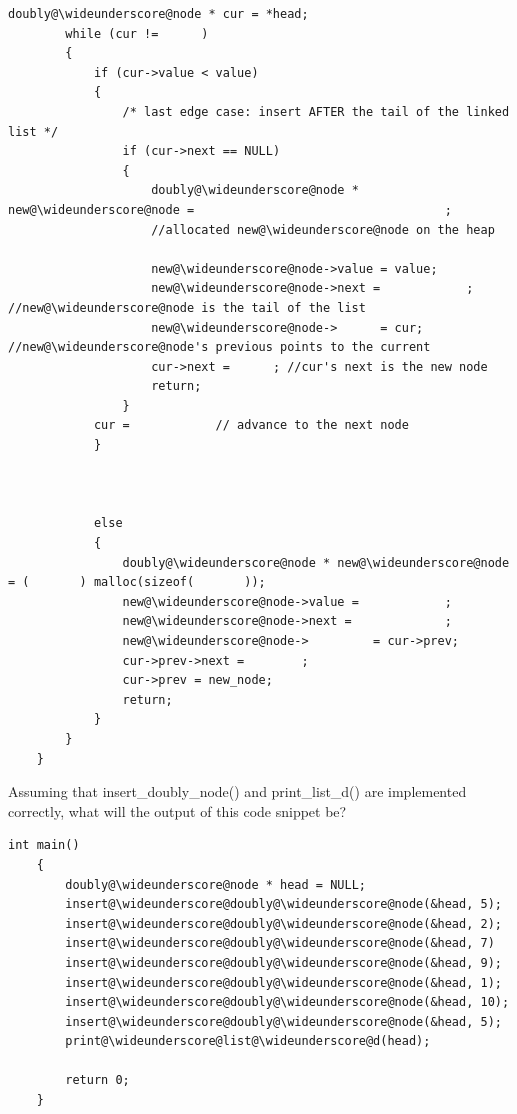 \documentclass{article}
\begin{document}
\begin{enumerate}[label=(\alph*), itemsep = 120pt]
\begin{lstlisting}[style = CStyle]
        doubly@\wideunderscore@node * cur = *head;
        while (cur !=      )
        {
            if (cur->value < value)
            {
                /* last edge case: insert AFTER the tail of the linked list */
                if (cur->next == NULL)
                {
                    doubly@\wideunderscore@node * new@\wideunderscore@node =                                   ; 
                    //allocated new@\wideunderscore@node on the heap

                    new@\wideunderscore@node->value = value;
                    new@\wideunderscore@node->next =            ; //new@\wideunderscore@node is the tail of the list
                    new@\wideunderscore@node->      = cur; //new@\wideunderscore@node's previous points to the current
                    cur->next =      ; //cur's next is the new node
                    return;
                }
            cur =            // advance to the next node
            }
        
        

            else 
            {
                doubly@\wideunderscore@node * new@\wideunderscore@node = (       ) malloc(sizeof(       ));
                new@\wideunderscore@node->value =            ;
                new@\wideunderscore@node->next =             ;
                new@\wideunderscore@node->         = cur->prev;
                cur->prev->next =        ;
                cur->prev = new_node;
                return;
            }
        }
    }
\end{lstlisting}

Assuming that insert\_doubly\_node() and print\_list\_d() are implemented correctly, what will the output of this code snippet be? 

\begin{lstlisting}[style = CStyle]
    int main()
    {
        doubly@\wideunderscore@node * head = NULL;
        insert@\wideunderscore@doubly@\wideunderscore@node(&head, 5);
        insert@\wideunderscore@doubly@\wideunderscore@node(&head, 2);
        insert@\wideunderscore@doubly@\wideunderscore@node(&head, 7)
        insert@\wideunderscore@doubly@\wideunderscore@node(&head, 9);
        insert@\wideunderscore@doubly@\wideunderscore@node(&head, 1);
        insert@\wideunderscore@doubly@\wideunderscore@node(&head, 10);
        insert@\wideunderscore@doubly@\wideunderscore@node(&head, 5);
        print@\wideunderscore@list@\wideunderscore@d(head);

        return 0;
    }
\end{lstlisting}

\end{enumerate}
\newpage
\end{document}
